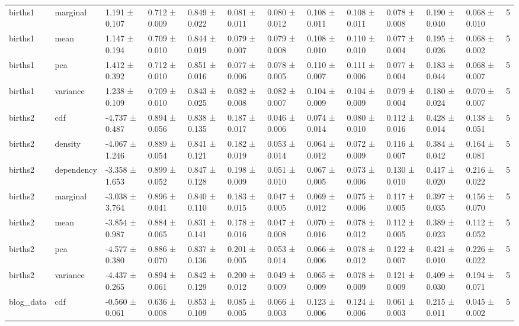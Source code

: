 \begin{table}
\begin{tabular}{llllllllllllr}
births1 & marginal & 1.191 ± 0.107 & 0.712 ± 0.009 & 0.849 ± 0.022 & 0.081 ± 0.011 & 0.080 ± 0.012 & 0.108 ± 0.011 & 0.108 ± 0.011 & 0.078 ± 0.008 & 0.190 ± 0.040 & 0.068 ± 0.010 & 5 \\
births1 & mean & 1.147 ± 0.194 & 0.709 ± 0.010 & 0.844 ± 0.019 & 0.079 ± 0.007 & 0.079 ± 0.008 & 0.108 ± 0.010 & 0.110 ± 0.010 & 0.077 ± 0.004 & 0.195 ± 0.026 & 0.068 ± 0.002 & 5 \\
births1 & pca & 1.412 ± 0.392 & 0.712 ± 0.010 & 0.851 ± 0.016 & 0.077 ± 0.006 & 0.078 ± 0.005 & 0.110 ± 0.007 & 0.111 ± 0.006 & 0.077 ± 0.004 & 0.183 ± 0.044 & 0.068 ± 0.007 & 5 \\
births1 & variance & 1.238 ± 0.109 & 0.709 ± 0.010 & 0.843 ± 0.025 & 0.082 ± 0.008 & 0.082 ± 0.007 & 0.104 ± 0.009 & 0.104 ± 0.009 & 0.079 ± 0.004 & 0.180 ± 0.024 & 0.070 ± 0.007 & 5 \\
births2 & cdf & -4.737 ± 0.487 & 0.894 ± 0.056 & 0.838 ± 0.135 & 0.187 ± 0.017 & 0.046 ± 0.006 & 0.074 ± 0.014 & 0.080 ± 0.010 & 0.112 ± 0.016 & 0.428 ± 0.014 & 0.138 ± 0.051 & 5 \\
births2 & density & -4.067 ± 1.246 & 0.889 ± 0.054 & 0.841 ± 0.121 & 0.182 ± 0.019 & 0.053 ± 0.014 & 0.064 ± 0.012 & 0.072 ± 0.009 & 0.116 ± 0.007 & 0.384 ± 0.042 & 0.164 ± 0.081 & 5 \\
births2 & dependency & -3.358 ± 1.653 & 0.899 ± 0.052 & 0.847 ± 0.128 & 0.198 ± 0.009 & 0.051 ± 0.010 & 0.067 ± 0.005 & 0.073 ± 0.006 & 0.130 ± 0.010 & 0.417 ± 0.020 & 0.216 ± 0.022 & 5 \\
births2 & marginal & -3.038 ± 3.764 & 0.896 ± 0.041 & 0.840 ± 0.110 & 0.183 ± 0.015 & 0.047 ± 0.005 & 0.069 ± 0.012 & 0.075 ± 0.006 & 0.117 ± 0.005 & 0.397 ± 0.035 & 0.156 ± 0.070 & 5 \\
births2 & mean & -3.854 ± 0.987 & 0.884 ± 0.065 & 0.831 ± 0.141 & 0.178 ± 0.016 & 0.047 ± 0.008 & 0.070 ± 0.016 & 0.078 ± 0.012 & 0.112 ± 0.005 & 0.389 ± 0.023 & 0.112 ± 0.052 & 5 \\
births2 & pca & -4.577 ± 0.380 & 0.886 ± 0.070 & 0.837 ± 0.136 & 0.201 ± 0.005 & 0.053 ± 0.014 & 0.066 ± 0.006 & 0.078 ± 0.012 & 0.122 ± 0.007 & 0.421 ± 0.010 & 0.226 ± 0.022 & 5 \\
births2 & variance & -4.437 ± 0.265 & 0.894 ± 0.061 & 0.842 ± 0.129 & 0.200 ± 0.012 & 0.049 ± 0.009 & 0.065 ± 0.009 & 0.078 ± 0.009 & 0.121 ± 0.009 & 0.409 ± 0.030 & 0.194 ± 0.071 & 5 \\
blog_data & cdf & -0.560 ± 0.061 & 0.636 ± 0.008 & 0.853 ± 0.109 & 0.085 ± 0.005 & 0.066 ± 0.003 & 0.123 ± 0.006 & 0.124 ± 0.006 & 0.061 ± 0.003 & 0.215 ± 0.011 & 0.045 ± 0.002 & 5 \\

\end{tabular}
\end{table}
